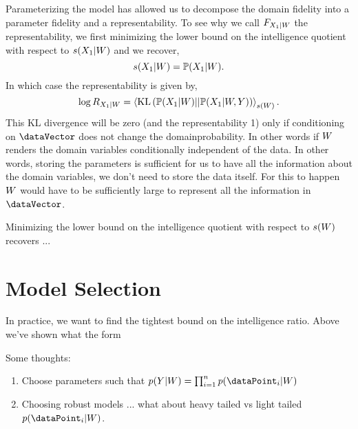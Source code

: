 \documentclass[]{article}
\begin{document}
Parameterizing the model has allowed us to decompose the domain fidelity into a parameter fidelity and a representability. To see why we call $F_{{X_1} |W}$ the representability, we first minimizing the lower bound on the intelligence quotient with respect to $s({X_1} | W)$ and we recover,
$$
s({X_1} | W) = \mathbb{P}({X_1} | W).
$$
In which case the representability is given by, 
$$
\log R_{{X_1} | W} = \left\langle  \text{KL}\left(\mathbb{P}({X_1}|W) || \mathbb{P}({X_1}|W, Y) \right) \right\rangle_{ s(W)}.
$$
This KL divergence will be zero (and the representability 1) only if conditioning on $\dataVector$ does not change the domainprobability. In other words if $W$ renders the domain variables conditionally independent of the data. In other words, storing the parameters is sufficient for us to have all the information about the domain variables, we don't need to store the data itself. For this to happen $W$ would have to be sufficiently large to represent all the information in $\dataVector$.

Minimizing the lower bound on the intelligence quotient with respect to $s(W)$ recovers ...

\section{Model Selection}

In practice, we want to find the tightest bound on the intelligence ratio. Above we've shown what the form 


Some thoughts:

\begin{enumerate}
    \item Choose parameters such that $\physicsProb(\dataVariables|\parameterVector) = \prod_{i=1}^n \physicsProb(\dataPoint_i |\parameterVector)$
    \item Choosing robust models ... what about heavy tailed vs light tailed $\physicsProb(\dataPoint_i |\parameterVector)$. 
\end{enumerate}
\end{document}
